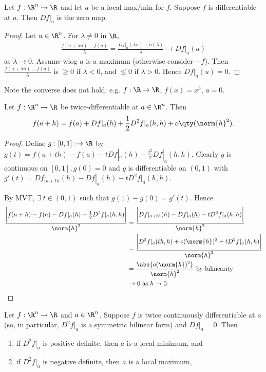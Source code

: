 \begin{proposition} \label{prp:2.1q}
    Let $f:\R^n \to \R$ and let $a$ be a local max/min for $f$. 
    Suppose $f$ is differentiable at $a$. 
    Then  $Df|_a$ is the zero map.
\end{proposition}

\begin{proof}
    Let $u\in \R^n$. For $\lambda\neq 0$ in $\R$, 
    \begin{align*}
        \frac{f(a+\lambda u) - f(a)}{\lambda} = \frac{Df|_a(\lambda u) + o(\lambda)}{\lambda} \to Df|_a(a)
    \end{align*} 
    as $\lambda\to 0$. 
    Assume wlog $a$ is a maximum (otherwise consider $-f$). 
    Then $\frac{f(a+\lambda u) - f(a)}{\lambda}$ is $\ge 0$ if $\lambda < 0$, and $\leq 0$ if $\lambda >0$. Hence $Df|_a(u) = 0$.
\end{proof}
Note the converse does not hold: e.g. $f:\R\to\R$, $f(x) = x^3$, $a=0$.

\begin{lemma} \label{lem:2.12}
    Let $f:\R^n\to \R$ be twice-differentiable at $a\in \R^n$. Then \[f(a+h) = f(a) + Df|_a(h) + \frac{1}{2} D^2f|_a(h,h) + o \qty(\norm{h}^2). \]
\end{lemma}

\begin{proof}
    Define $g: [0,1]: \to \R$ by $g(t) = f(a+th) - f(a) - tDf|_a(h) - \frac{t^2}{2} Df|_a(h,h)$. 
    Clearly $g$ is continuous on $[0,1], g(0)=0$ and $g$ is differentiable on $(0,1)$ with $g'(t) = Df|_{a+th}(h) - Df|_a(h) - tD^2f|_a(h,h)$.

    By MVT, $\exists \; t \in (0,1)$ such that $g(1) -g(0) = g'(t)$. 
    Hence 
    \begin{align*}
        \frac{\bigg| f(a+h) - f(a) - Df|_a(h) -\frac{1}{2} D^2f|_a(h,h) \bigg| }{\norm{h}^2} &= \frac{ \bigg| Df|_{a+th}(h) - Df|_a(h) - tD^2f|_a(h,h) \bigg|}{\norm{h}^2}\\
        &= \frac{\bigg| D^2f|_a(th,h) + o(\norm{h})^2 - tD^2f|_a(h,h) \bigg|}{\norm{h}^2} \\
        &= \frac{\abs{o(\norm{h})^2}}{\norm{h}^2} \text{ by bilinearity} \\
        &\to 0 \text{ as } h \to 0.
    \end{align*}
\end{proof}

\begin{theorem}
    Let $f: \R^n\to \R$ and $a\in\R^n$. Suppose $f$ is twice continuously differentiable at $a$ (so, in particular, $D^2f|_a$ is a symmetric bilinear form) and $Df|_a = 0$. Then
    \begin{enumerate}
        \item if $D^2f|_a$ is positive definite, then $a$ is a local minimum, and 
        \item if $D^2f|_a$ is negative definite, then $a$ is a local maximum,
    \end{enumerate}
\end{theorem}

